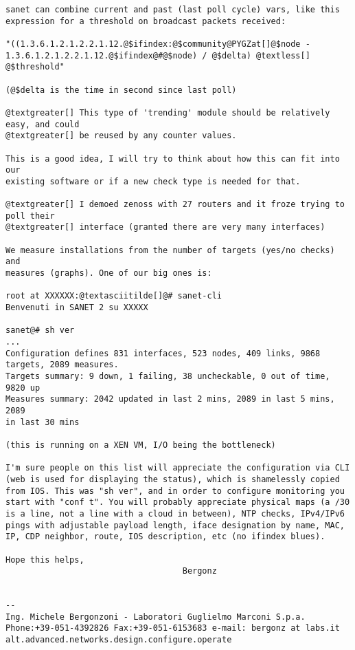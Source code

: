 \documentclass[a4wide,10pt,italian]{manual}
\begin{document}
\begin{Verbatim}[commandchars=@\[\]]
sanet can combine current and past (last poll cycle) vars, like this
expression for a threshold on broadcast packets received:

"((1.3.6.1.2.1.2.2.1.12.@$ifindex:@$community@PYGZat[]@$node -
1.3.6.1.2.1.2.2.1.12.@$ifindex@#@$node) / @$delta) @textless[] @$threshold"

(@$delta is the time in second since last poll)

@textgreater[] This type of 'trending' module should be relatively easy, and could
@textgreater[] be reused by any counter values.

This is a good idea, I will try to think about how this can fit into our
existing software or if a new check type is needed for that.

@textgreater[] I demoed zenoss with 27 routers and it froze trying to poll their
@textgreater[] interface (granted there are very many interfaces)

We measure installations from the number of targets (yes/no checks) and
measures (graphs). One of our big ones is:

root at XXXXXX:@textasciitilde[]@# sanet-cli
Benvenuti in SANET 2 su XXXXX

sanet@# sh ver
...
Configuration defines 831 interfaces, 523 nodes, 409 links, 9868
targets, 2089 measures.
Targets summary: 9 down, 1 failing, 38 uncheckable, 0 out of time, 9820 up
Measures summary: 2042 updated in last 2 mins, 2089 in last 5 mins, 2089
in last 30 mins

(this is running on a XEN VM, I/O being the bottleneck)

I'm sure people on this list will appreciate the configuration via CLI
(web is used for displaying the status), which is shamelessly copied
from IOS. This was "sh ver", and in order to configure monitoring you
start with "conf t". You will probably appreciate physical maps (a /30
is a line, not a line with a cloud in between), NTP checks, IPv4/IPv6
pings with adjustable payload length, iface designation by name, MAC,
IP, CDP neighbor, route, IOS description, etc (no ifindex blues).

Hope this helps,
                                    Bergonz


--
Ing. Michele Bergonzoni - Laboratori Guglielmo Marconi S.p.a.
Phone:+39-051-4392826 Fax:+39-051-6153683 e-mail: bergonz at labs.it
alt.advanced.networks.design.configure.operate
\end{Verbatim}

\resetcurrentobjects
\hypertarget{--doc-appendix/security}{}
\end{document}
